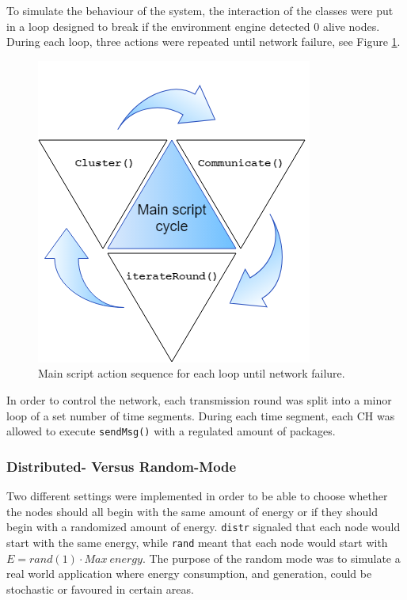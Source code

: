 \noindent To simulate the behaviour of the system, the interaction of the classes were put in a loop designed to break if the environment engine detected 0 alive nodes. During each loop, three actions were repeated until network failure, see Figure \ref{fig:mainscriptflowchart}.
\begin{figure}
    \centering
    \includegraphics[scale = 0.45]{Images/mainscriptflowchart.png}
    \caption{Main script action sequence for each loop until network failure.}
    \label{fig:mainscriptflowchart}
\end{figure}
In order to control the network, each transmission round was split into a minor loop of a set number of time segments. During each time segment, each CH was allowed to execute \verb!sendMsg()! with a regulated amount of packages. \newline


\subsubsection{Distributed- Versus Random-Mode}
Two different settings were implemented in order to be able to choose whether the nodes should all begin with the same amount of energy or if they should begin with a randomized amount of energy. \verb!distr! signaled that each node would start with the same energy, while \verb!rand! meant that each node would start with $E=rand(1)\cdot Max\:energy$. The purpose of the random mode was to simulate a real world application where energy consumption, and generation, could be stochastic or favoured in certain areas.

